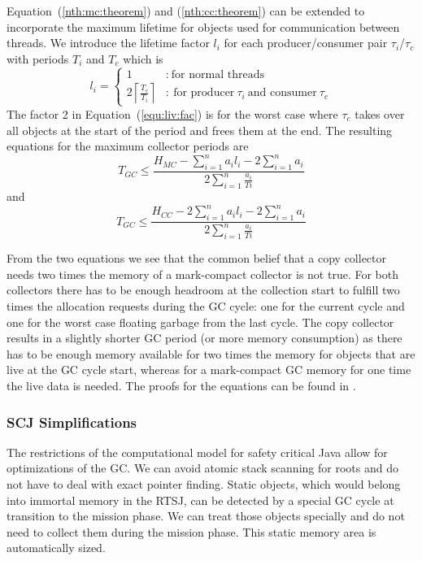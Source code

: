 Equation~(\ref{nth:mc:theorem}) and (\ref{nth:cc:theorem}) can be
extended to incorporate the maximum lifetime for objects used for
communication between threads. We introduce the lifetime factor
$l_i$ for each producer/consumer pair $\tau_i$/$\tau_c$ with periods
$T_i$ and $T_c$ which is
\begin{equation}\label{equ:liv:fac}
    l_i = \left\{
    \begin{array}{ll}
    1 & :\ \mbox{for normal threads}\\
    2\left\lceil\frac{T_c}{T_i}\right\rceil & :
    \ \mbox{for producer}\ \tau_i\ \mbox{and consumer}\ \tau_c
    \end{array}
    \right.
\end{equation}
The factor 2 in Equation~(\ref{equ:liv:fac}) is for the worst case
where $\tau_c$ takes over all objects at the start of the period and
frees them at the end. The resulting equations for the maximum
collector periods are
\begin{equation}
    T_{GC} \le \frac{H_{MC}-\sum_{i=1}^{n} a_i l_i - 2\sum_{i=1}^{n} a_i}{2\sum_{i=1}^{n} \frac{a_i}{Ti}}
\end{equation}
and
\begin{equation}
    T_{GC} \le \frac{H_{CC}-2\sum_{i=1}^{n} a_i l_i - 2\sum_{i=1}^{n} a_i}{2\sum_{i=1}^{n}
    \frac{a_i}{Ti}}
\end{equation}

From the two equations we see that the common belief that a copy
collector needs two times the memory of a mark-compact collector is
not true. For both collectors there has to be enough headroom at the
collection start to fulfill two times the allocation requests during
the GC cycle: one for the current cycle and one for the worst case
floating garbage from the last cycle. The copy collector results in
a slightly shorter GC period (or more memory consumption) as there
has to be enough memory available for two times the memory for
objects that are live at the GC cycle start, whereas for a
mark-compact GC memory for one time the live data is needed. The
proofs for the equations can be found in \cite{jop:rtgc_sched}.

\subsubsection{SCJ Simplifications} \label{sec:scj:simple}

The restrictions of the computational model for safety critical Java
allow for optimizations of the GC. We can avoid atomic stack
scanning for roots and do not have to deal with exact pointer
finding. Static objects, which would belong into immortal memory in
the RTSJ, can be detected by a special GC cycle at transition to the
mission phase. We can treat those objects specially and do not need
to collect them during the mission phase. This static memory area is
automatically sized.

